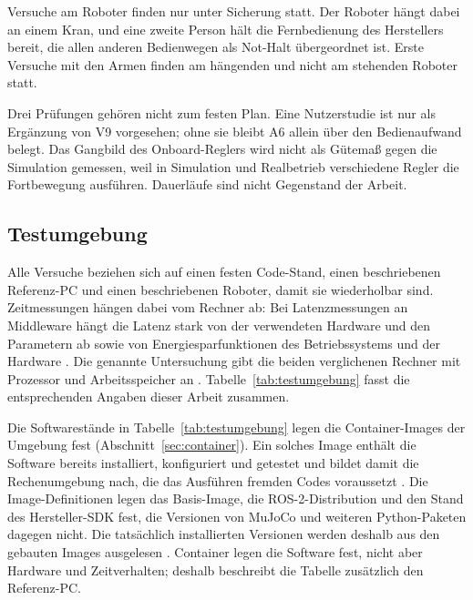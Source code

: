 Versuche am Roboter finden nur unter Sicherung statt.
Der Roboter hängt dabei an einem Kran, und eine zweite Person hält die Fernbedienung des Herstellers bereit, die allen anderen Bedienwegen als Not-Halt übergeordnet ist.
Erste Versuche mit den Armen finden am hängenden und nicht am stehenden Roboter statt.

Drei Prüfungen gehören nicht zum festen Plan.
Eine Nutzerstudie ist nur als Ergänzung von V9 vorgesehen; ohne sie bleibt A6 allein über den Bedienaufwand belegt.
Das Gangbild des Onboard-Reglers wird nicht als Gütemaß gegen die Simulation gemessen, weil in Simulation und Realbetrieb verschiedene Regler die Fortbewegung ausführen.
Dauerläufe sind nicht Gegenstand der Arbeit.

\subsection{Testumgebung}
\label{sec:testumgebung}
Alle Versuche beziehen sich auf einen festen Code-Stand, einen beschriebenen Referenz-PC und einen beschriebenen Roboter, damit sie wiederholbar sind.
Zeitmessungen hängen dabei vom Rechner ab: Bei Latenzmessungen an Middleware hängt die Latenz stark von der verwendeten Hardware und den Parametern ab \cite{Kronauer2021} sowie von Energiesparfunktionen des Betriebssystems und der Hardware \cite{Kronauer2021}.
Die genannte Untersuchung gibt die beiden verglichenen Rechner mit Prozessor und Arbeitsspeicher an \cite{Kronauer2021}.
Tabelle~\ref{tab:testumgebung} fasst die entsprechenden Angaben dieser Arbeit zusammen.

Die Softwarestände in Tabelle~\ref{tab:testumgebung} legen die Container-Images der Umgebung fest (Abschnitt~\ref{sec:container}).
Ein solches Image enthält die Software bereits installiert, konfiguriert und getestet \cite{Boettiger2015} und bildet damit die Rechenumgebung nach, die das Ausführen fremden Codes voraussetzt \cite{Boettiger2015}.
Die Image-Definitionen legen das Basis-Image, die ROS-2-Distribution und den Stand des Hersteller-SDK fest, die Versionen von MuJoCo und weiteren Python-Paketen dagegen nicht.
Die tatsächlich installierten Versionen werden deshalb aus den gebauten Images ausgelesen .
Container legen die Software fest, nicht aber Hardware und Zeitverhalten; deshalb beschreibt die Tabelle zusätzlich den Referenz-PC.


